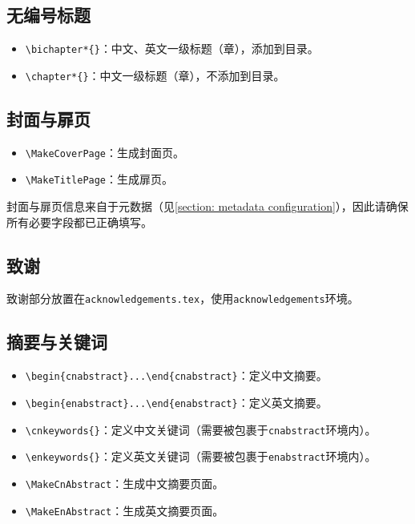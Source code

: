 \subsection{无编号标题}
\begin{itemize}[itemsep=2pt,topsep=5pt]
  \item \verb|\bichapter*{}|：中文、英文一级标题（章），添加到目录。
  \item \verb|\chapter*{}|：中文一级标题（章），不添加到目录。
\end{itemize}



\subsection{封面与扉页}
\begin{itemize}[itemsep=2pt,topsep=5pt]
    \item \verb|\MakeCoverPage|：生成封面页。
    \item \verb|\MakeTitlePage|：生成扉页。
\end{itemize}

封面与扉页信息来自于元数据（见\ref{section: metadata configuration}），因此请确保所有必要字段都已正确填写。

\subsection{致谢}
致谢部分放置在\texttt{acknowledgements.tex}，使用\texttt{acknowledgements}环境。

\subsection{摘要与关键词}
\begin{itemize}[itemsep=2pt,topsep=5pt]
    \item \verb|\begin{cnabstract}...\end{cnabstract}|：定义中文摘要。
    \item \verb|\begin{enabstract}...\end{enabstract}|：定义英文摘要。
    \item \verb|\cnkeywords{}|：定义中文关键词（需要被包裹于\texttt{cnabstract}环境内）。
    \item \verb|\enkeywords{}|：定义英文关键词（需要被包裹于\texttt{enabstract}环境内）。
    \item \verb|\MakeCnAbstract|：生成中文摘要页面。
    \item \verb|\MakeEnAbstract|：生成英文摘要页面。
\end{itemize}

